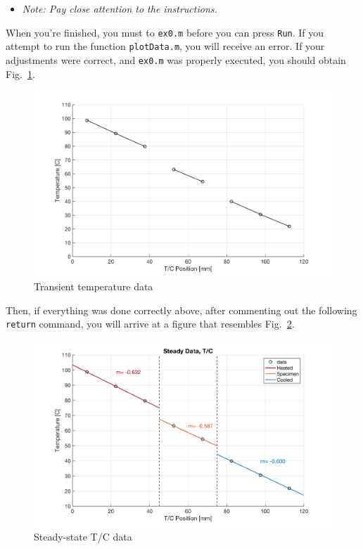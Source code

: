 \documentclass[11pt, letterpaper]{article}
\begin{document}
\begin{itemize}
    \item \textit{Note: Pay close attention to the instructions.}
\end{itemize}

When you're finished, you must  to \texttt{ex0.m} before you can press \texttt{Run}. If you attempt to run the function \texttt{plotData.m}, you will receive an error. If your adjustments were correct, and \texttt{ex0.m} was properly executed, you should obtain Fig.~\ref{fig2}.


\begin{figure}[H]
    \begin{center}
        \includegraphics[width=125mm]{gfx/fig2.png}
    \caption{Transient temperature data}\label{fig2}
    \end{center}
\end{figure}

Then, if everything was done correctly above, after commenting out the following \texttt{return} command, you will arrive at a figure that resembles Fig.~\ref{fig3}.

\begin{figure}[H]
    \begin{center}
        \includegraphics[width=125mm]{gfx/fig3.png}
    \caption{Steady-state T/C data}\label{fig3}
    \end{center}
\end{figure}
\end{document}
